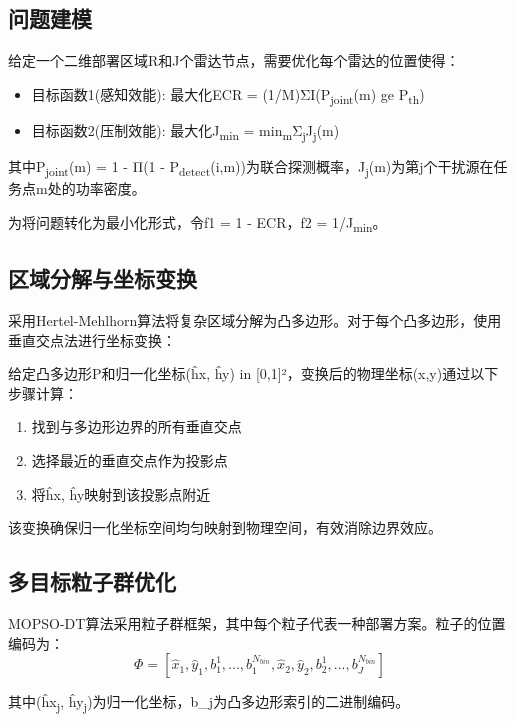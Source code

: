 \subsection{问题建模}

给定一个二维部署区域R和J个雷达节点，需要优化每个雷达的位置使得：
\begin{itemize}
    \item 目标函数1(感知效能): 最大化ECR = (1/M)ΣI(P\textsubscript{joint}(m) ge P\textsubscript{th})
    \item 目标函数2(压制效能): 最大化J\textsubscript{min} = min\textsubscript{m}{Σ\textsubscript{j}J\textsubscript{j}(m)}
\end{itemize}

其中P\textsubscript{joint}(m) = 1 - Π(1 - P\textsubscript{detect}(i,m))为联合探测概率，J\textsubscript{j}(m)为第j个干扰源在任务点m处的功率密度。

为将问题转化为最小化形式，令f1 = 1 - ECR，f2 = 1/J\textsubscript{min}。

\subsection{区域分解与坐标变换}

采用Hertel-Mehlhorn算法将复杂区域分解为凸多边形。对于每个凸多边形，使用垂直交点法进行坐标变换：

给定凸多边形P和归一化坐标(ĥx, ĥy) in [0,1]²，变换后的物理坐标(x,y)通过以下步骤计算：
\begin{enumerate}
    \item 找到与多边形边界的所有垂直交点
    \item 选择最近的垂直交点作为投影点
    \item 将ĥx, ĥy映射到该投影点附近
\end{enumerate}

该变换确保归一化坐标空间均匀映射到物理空间，有效消除边界效应。

\subsection{多目标粒子群优化}

MOPSO-DT算法采用粒子群框架，其中每个粒子代表一种部署方案。粒子的位置编码为：
\begin{equation}
    \Phi = [\hat{x}_1, \hat{y}_1, b_1^1, ..., b_1^{N_{bin}}, \hat{x}_2, \hat{y}_2, b_2^1, ..., b_J^{N_{bin}}]
\end{equation}

其中(ĥx\textsubscript{j}, ĥy\textsubscript{j})为归一化坐标，b\_j为凸多边形索引的二进制编码。

